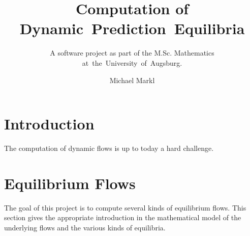 \documentclass[titlepage]{scrartcl}
\author{Michael Markl}
\title{Computation of Dynamic~Prediction~Equilibria}
\subtitle{A software project as part of the M.Sc. Mathematics at~the~University~of~Augsburg.}
\theoremstyle{definition}
\begin{document}
    \maketitle

    \newpage
    \tableofcontents

    \newpage
    \section{Introduction}

    The computation of dynamic flows is up to today a hard challenge.


    \newpage
    

    \newpage
    \section{Equilibrium Flows}

    The goal of this project is to compute several kinds of equilibrium flows.
    This section gives the appropriate introduction in the mathematical model of the underlying flows and the various kinds of equilibria.
    
    
    

    \newpage
    
        
\end{document}
